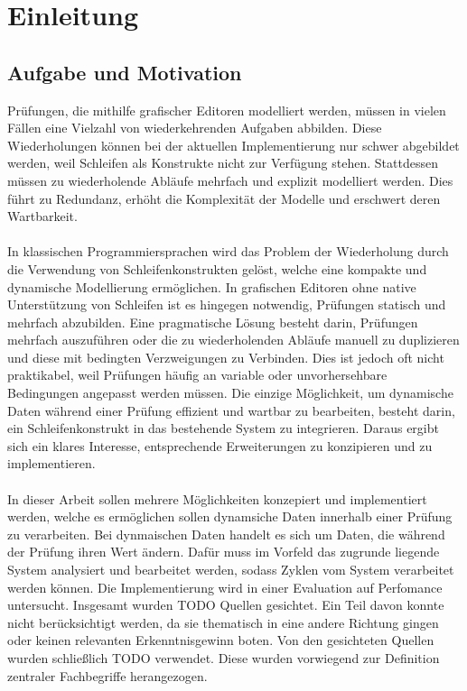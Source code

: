 \documentclass{article}
\begin{document}
    \tableofcontents
    \newpage
    \section{Einleitung}
    \subsection{Aufgabe und Motivation}
    Prüfungen, die mithilfe grafischer Editoren modelliert werden, müssen in vielen Fällen eine Vielzahl von wiederkehrenden Aufgaben abbilden. 
    Diese Wiederholungen können bei der aktuellen Implementierung nur schwer abgebildet werden, weil Schleifen als Konstrukte nicht zur Verfügung stehen. 
    Stattdessen müssen zu wiederholende Abläufe mehrfach und explizit modelliert werden. 
    Dies führt zu Redundanz, erhöht die Komplexität der Modelle und erschwert deren Wartbarkeit.\\
    \\
    In klassischen Programmiersprachen wird das Problem der Wiederholung durch die Verwendung von Schleifenkonstrukten gelöst, welche eine kompakte und dynamische Modellierung ermöglichen. 
    In grafischen Editoren ohne native Unterstützung von Schleifen ist es hingegen notwendig, Prüfungen statisch und mehrfach abzubilden. 
    Eine pragmatische Lösung besteht darin, Prüfungen mehrfach auszuführen oder die zu wiederholenden Abläufe manuell zu duplizieren und diese mit bedingten Verzweigungen zu Verbinden. 
    Dies ist jedoch oft nicht praktikabel, weil Prüfungen häufig an variable oder unvorhersehbare Bedingungen angepasst werden müssen.
    Die einzige Möglichkeit, um dynamische Daten während einer Prüfung effizient und wartbar zu bearbeiten, besteht darin, ein Schleifenkonstrukt in das bestehende System zu integrieren. 
    Daraus ergibt sich ein klares Interesse, entsprechende Erweiterungen zu konzipieren und zu implementieren.\\
    \\
    In dieser Arbeit sollen mehrere Möglichkeiten konzepiert und implementiert werden, welche es ermöglichen sollen dynamsiche Daten innerhalb einer Prüfung zu verarbeiten.
    Bei dynmaischen Daten handelt es sich um Daten, die während der Prüfung ihren Wert ändern.
    Dafür muss im Vorfeld das zugrunde liegende System analysiert und bearbeitet werden, sodass Zyklen vom System verarbeitet werden können.
    Die Implementierung wird in einer Evaluation auf Perfomance untersucht.
    Insgesamt wurden TODO Quellen gesichtet. 
    Ein Teil davon konnte nicht berücksichtigt werden, da sie thematisch in eine andere Richtung gingen oder keinen relevanten Erkenntnisgewinn boten. 
    Von den gesichteten Quellen wurden schließlich TODO verwendet. 
    Diese wurden vorwiegend zur Definition zentraler Fachbegriffe herangezogen.
\end{document}
